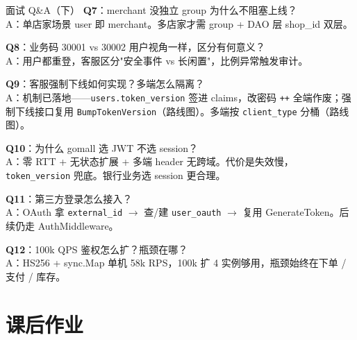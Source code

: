 \documentclass[aspectratio=169,11pt]{beamer}
\begin{document}
\begin{frame}[shrink]{面试 Q\&A（下）}
\scriptsize
\textbf{Q7}：merchant 没独立 group 为什么不阻塞上线？\\
\hspace{3mm}A：单店家场景 user 即 merchant。多店家才需 group + DAO 层 shop\_id 双层。

\vspace{1mm}
\textbf{Q8}：业务码 30001 vs 30002 用户视角一样，区分有何意义？\\
\hspace{3mm}A：用户都重登，客服区分"安全事件 vs 长闲置"，比例异常触发审计。

\vspace{1mm}
\textbf{Q9}：客服强制下线如何实现？多端怎么隔离？\\
\hspace{3mm}A：机制已落地——\texttt{users.token\_version} 签进 claims，改密码 \texttt{++} 全端作废；强制下线接口复用 \texttt{BumpTokenVersion}（路线图）。多端按 \texttt{client\_type} 分桶（路线图）。

\vspace{1mm}
\textbf{Q10}：为什么 gomall 选 JWT 不选 session？\\
\hspace{3mm}A：零 RTT + 无状态扩展 + 多端 header 无跨域。代价是失效慢，\texttt{token\_version} 兜底。银行业务选 session 更合理。

\vspace{1mm}
\textbf{Q11}：第三方登录怎么接入？\\
\hspace{3mm}A：OAuth 拿 \texttt{external\_id} $\to$ 查/建 \texttt{user\_oauth} $\to$ 复用 GenerateToken。后续仍走 AuthMiddleware。

\vspace{1mm}
\textbf{Q12}：100k QPS 鉴权怎么扩？瓶颈在哪？\\
\hspace{3mm}A：HS256 + sync.Map 单机 58k RPS，100k 扩 4 实例够用，瓶颈始终在下单 / 支付 / 库存。
\end{frame}
\section*{课后作业}
\end{document}

